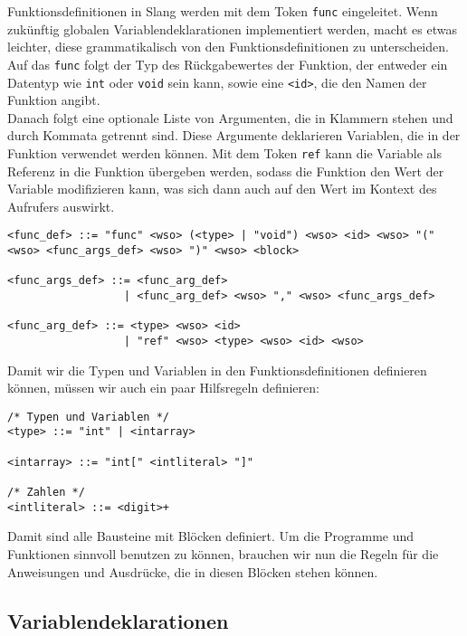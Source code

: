 Funktionsdefinitionen in Slang werden mit dem Token \texttt{func} eingeleitet.
Wenn zukünftig globalen Variablendeklarationen implementiert werden, macht es etwas leichter, diese grammatikalisch von den Funktionsdefinitionen zu unterscheiden.\\
Auf das \texttt{func} folgt der Typ des Rückgabewertes der Funktion, der entweder ein Datentyp wie \texttt{int} oder \texttt{void} sein kann, sowie eine \texttt{<id>}, die den Namen der Funktion angibt.\\
Danach folgt eine optionale Liste von Argumenten, die in Klammern stehen und durch Kommata getrennt sind.
Diese Argumente deklarieren Variablen, die in der Funktion verwendet werden können.
Mit dem Token \texttt{ref} kann die Variable als Referenz in die Funktion übergeben werden, sodass die Funktion den Wert der Variable modifizieren kann, was sich dann auch auf den Wert im Kontext des Aufrufers auswirkt.

\begin{lstlisting}[caption={Grammatikdefinition Funktionsdefinitionen}]
<func_def> ::= "func" <wso> (<type> | "void") <wso> <id> <wso> "(" <wso> <func_args_def> <wso> ")" <wso> <block>

<func_args_def> ::= <func_arg_def>
                  | <func_arg_def> <wso> "," <wso> <func_args_def>

<func_arg_def> ::= <type> <wso> <id>
                  | "ref" <wso> <type> <wso> <id> <wso>
\end{lstlisting}

Damit wir die Typen und Variablen in den Funktionsdefinitionen definieren können, müssen wir auch ein paar Hilfsregeln definieren:

\begin{lstlisting}[caption={Grammatikdefinition Hilfsregeln}]
/* Typen und Variablen */
<type> ::= "int" | <intarray>

<intarray> ::= "int[" <intliteral> "]"

/* Zahlen */
<intliteral> ::= <digit>+
\end{lstlisting}

Damit sind alle Bausteine mit Blöcken definiert.
Um die Programme und Funktionen sinnvoll benutzen zu können, brauchen wir nun die Regeln für die Anweisungen und Ausdrücke, die in diesen Blöcken stehen können.\\

\subsection{Variablendeklarationen}

